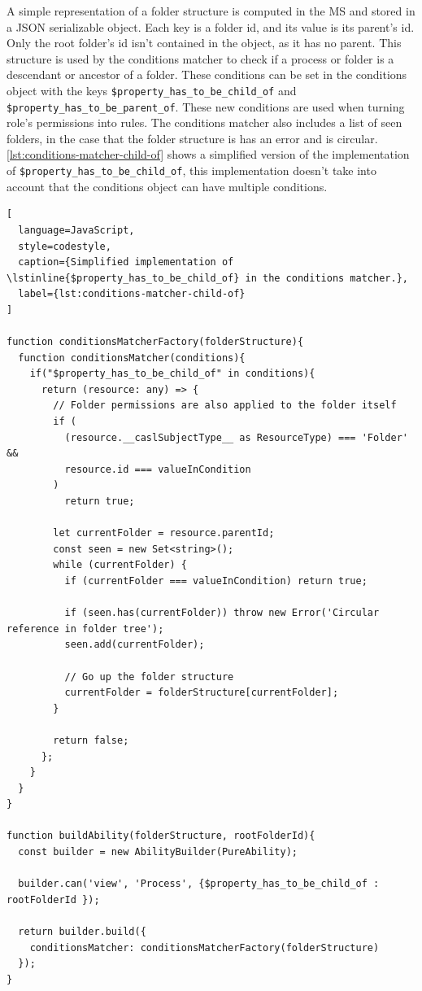
A simple representation of a folder structure is computed in the MS
and stored in a JSON serializable object.
Each key is a folder id, and its value is its parent's id.
Only the root folder's id isn't contained in the object, as it has no parent.
This structure is used by the conditions matcher to check if a process or folder is a
descendant or ancestor of a folder.
These conditions can be set in the conditions object with the keys
\lstinline{$property_has_to_be_child_of} and \lstinline{$property_has_to_be_parent_of}.
These new conditions are used when turning role's permissions into rules.
The conditions matcher also includes a list of seen folders, in the case that the folder
structure is has an error and is circular.
\ref{lst:conditions-matcher-child-of} shows a simplified version of the implementation of
\lstinline{$property_has_to_be_child_of}, this implementation doesn't take into account
that the conditions object can have multiple conditions.

\begin{lstlisting}[
  language=JavaScript,
  style=codestyle,
  caption={Simplified implementation of \lstinline{$property_has_to_be_child_of} in the conditions matcher.},
  label={lst:conditions-matcher-child-of}
]

function conditionsMatcherFactory(folderStructure){
  function conditionsMatcher(conditions){
    if("$property_has_to_be_child_of" in conditions){
      return (resource: any) => {
        // Folder permissions are also applied to the folder itself
        if (
          (resource.__caslSubjectType__ as ResourceType) === 'Folder' &&
          resource.id === valueInCondition
        )
          return true;

        let currentFolder = resource.parentId;
        const seen = new Set<string>();
        while (currentFolder) {
          if (currentFolder === valueInCondition) return true;

          if (seen.has(currentFolder)) throw new Error('Circular reference in folder tree');
          seen.add(currentFolder);

          // Go up the folder structure
          currentFolder = folderStructure[currentFolder];
        }

        return false;
      };
    }
  }
}

function buildAbility(folderStructure, rootFolderId){
  const builder = new AbilityBuilder(PureAbility);

  builder.can('view', 'Process', {$property_has_to_be_child_of : rootFolderId });

  return builder.build({
    conditionsMatcher: conditionsMatcherFactory(folderStructure) 
  });
}
\end{lstlisting}


